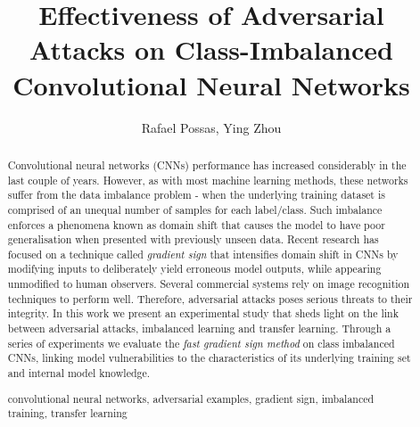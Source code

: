 \documentclass[runningheads,a4paper]{llncs}
\newcommand{\keywords}[1]{\par\addvspace\baselineskip
\noindent\keywordname\enspace\ignorespaces#1}
\begin{document}
\mainmatter  %

\title{Effectiveness of Adversarial Attacks on Class-Imbalanced Convolutional Neural Networks}

%
%
\author{Rafael Possas, Ying Zhou}
%


%
%

\maketitle


\begin{abstract}
Convolutional neural networks (CNNs) performance has increased considerably in the last couple of years. However, as with most machine learning methods, these networks suffer from the data imbalance problem - when the underlying training dataset is comprised of an unequal number of samples for each label/class. Such imbalance enforces a phenomena known as domain shift that causes the model to have poor generalisation when presented with previously unseen data. Recent research has focused on a technique called \textit{gradient sign} that intensifies domain shift in CNNs by modifying inputs to deliberately yield erroneous model outputs, while appearing unmodified to human observers. Several commercial systems rely on image recognition techniques to perform well. Therefore, adversarial attacks poses serious threats to their integrity. In this work we present an experimental study that sheds light on the link between adversarial attacks, imbalanced learning and transfer learning. Through a series of experiments we evaluate the \textit{fast gradient sign method} on class imbalanced CNNs, linking model vulnerabilities to the characteristics of its underlying training set and internal model knowledge.
\keywords{convolutional neural networks, adversarial examples, gradient sign, imbalanced training, transfer learning}
\end{abstract}
\end{document}
